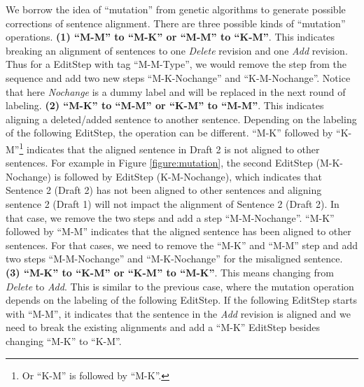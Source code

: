 \documentclass[11pt]{article}
\begin{document}
We borrow the idea of ``mutation'' from genetic algorithms to generate possible corrections of sentence alignment. There are three possible kinds of ``mutation'' operations. \textbf{(1) ``M-M'' to ``M-K'' or ``M-M'' to ``K-M''}. This indicates breaking an alignment of sentences to one \textit{Delete} revision and one \textit{Add} revision. Thus for a EditStep with tag ``M-M-Type'', we would remove the step from the sequence and add two new steps ``M-K-Nochange'' and ``K-M-Nochange''. Notice that here \textit{Nochange} is a dummy label and will be replaced in the next round of labeling. \textbf{(2) ``M-K'' to ``M-M'' or ``K-M'' to ``M-M''}. This indicates aligning a deleted/added sentence to another sentence. Depending on the labeling of the following EditStep, the operation can be different. ``M-K'' followed by ``K-M''\footnote{Or ``K-M'' is followed by ``M-K''.} indicates that the aligned sentence in Draft 2 is not aligned to other sentences. For example in Figure \ref{figure:mutation}, the second EditStep (M-K-Nochange) is followed by EditStep (K-M-Nochange), which indicates that Sentence 2 (Draft 2) has not been aligned to other sentences and aligning sentence 2 (Draft 1) will not impact the alignment of Sentence 2 (Draft 2). In that case, we remove the two steps and add a step ``M-M-Nochange''. ``M-K'' followed by ``M-M'' indicates that the aligned sentence has been aligned to other sentences. For that cases, we need to remove the ``M-K'' and ``M-M'' step and add two steps ``M-M-Nochange'' and ``M-K-Nochange'' for the misaligned sentence. \textbf{(3) ``M-K'' to ``K-M'' or ``K-M'' to ``M-K''}. This means changing from \textit{Delete} to \textit{Add}. This is similar to the previous case, where the mutation operation depends on the labeling of the following EditStep. If the following EditStep starts with ``M-M'', it indicates that the sentence in the \textit{Add} revision is aligned and we need to break the existing alignments and add a ``M-K'' EditStep besides changing ``M-K'' to ``K-M''. 
\end{document}
